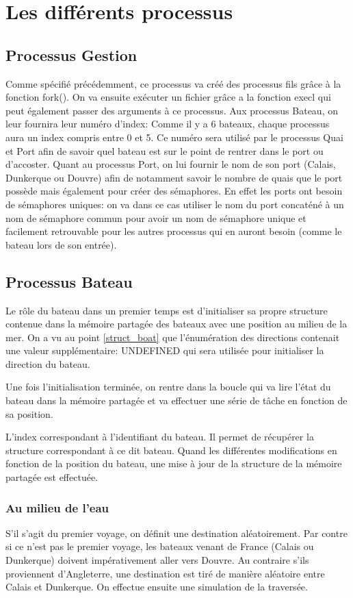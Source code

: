 \documentclass[a4paper, 11pt]{article}
\begin{document}
\section{Les différents processus}
	\subsection{Processus Gestion}
		Comme spécifié précédemment, ce processus va créé des processus fils grâce à la fonction fork(). On va ensuite exécuter un fichier grâce a la fonction execl qui peut également passer des arguments à ce processus. Aux processus Bateau, on leur fournira leur numéro d'index: Comme il y a 6 bateaux, chaque processus aura un index compris entre 0 et 5. Ce numéro sera utilisé par le processus Quai et Port afin de savoir quel bateau est sur le point de rentrer dans le port ou d'accoster. Quant au processus Port, on lui fournir le nom de son port (Calais, Dunkerque ou Douvre) afin de notamment savoir le nombre de quais que le port possède mais également pour créer des sémaphores. En effet les ports ont besoin de sémaphores uniques: on va dans ce cas utiliser le nom du port concaténé à un nom de sémaphore commun pour avoir un nom de sémaphore unique et facilement retrouvable pour les autres processus qui en auront besoin (comme le bateau lors de son entrée).
		
			
	\subsection{Processus Bateau}
		Le rôle du bateau dans un premier temps est d'initialiser sa propre structure contenue dans la mémoire partagée des bateaux avec une position au milieu de la mer. On a vu au point \ref{struct_boat} que l'énumération des directions contenait une valeur supplémentaire: UNDEFINED qui sera utilisée pour initialiser la direction du bateau. 
		
		Une fois l'initialisation terminée, on rentre dans la boucle qui va lire l'état du bateau dans la mémoire partagée et va effectuer une série de tâche en fonction de sa position. 
			
		L'index correspondant à l'identifiant du bateau. Il permet de récupérer la structure correspondant à ce dit bateau. Quand les différentes modifications en fonction de la position du bateau, une mise à jour de la structure de la mémoire partagée est effectuée.
		\subsubsection{Au milieu de l'eau}
			
			S'il s'agit du premier voyage, on définit une destination aléatoirement. Par contre si ce n'est pas le premier voyage, les bateaux venant de France (Calais ou Dunkerque) doivent impérativement aller vers Douvre. Au contraire s'ils proviennent d'Angleterre, une destination est tiré de manière aléatoire entre Calais et Dunkerque. On effectue ensuite une simulation de la traversée.
\end{document}
